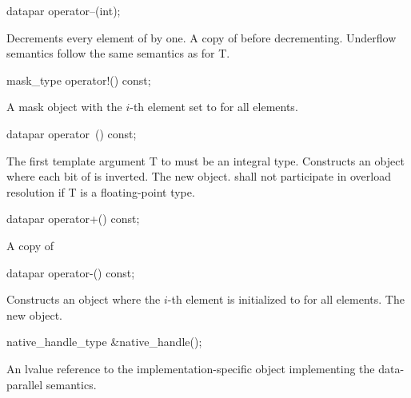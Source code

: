 \begin{wgText}
  \begin{itemdecl}
datapar operator--(int);
  \end{itemdecl}
  \begin{itemdescr}
    \pnum\effects Decrements every element of  by one.
    \pnum\returns A copy of  before decrementing.
    \pnum\remarks Underflow semantics follow the same semantics as for \type T.
  \end{itemdescr}

  \begin{itemdecl}
mask_type operator!() const;
  \end{itemdecl}
  \begin{itemdescr}
    \pnum\returns A mask object with the $i$-th element set to  for all elements.
  \end{itemdescr}

  \begin{itemdecl}
datapar operator~() const;
  \end{itemdecl}
  \begin{itemdescr}
    \pnum\requires The first template argument \type T to \datapar must be an integral type.
    \pnum\effects Constructs an object where each bit of  is inverted.
    \pnum\returns The new object.
    \pnum\remarks \datapar{} shall not participate in overload resolution if \type T is a floating-point type.
  \end{itemdescr}

  \begin{itemdecl}
datapar operator+() const;
  \end{itemdecl}
  \begin{itemdescr}
    \pnum \returns A copy of 
  \end{itemdescr}

  \begin{itemdecl}
datapar operator-() const;
  \end{itemdecl}
  \begin{itemdescr}
    \pnum\effects Constructs an object where the $i$-th element is initialized to  for all elements.
    \pnum\returns The new object.
  \end{itemdescr}

  \begin{itemdecl}
native_handle_type &native_handle();
  \end{itemdecl}
  \begin{itemdescr}
    \pnum\returns An lvalue reference to the implementation-specific object implementing the data-parallel semantics.
  \end{itemdescr}


\end{wgText}
